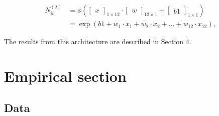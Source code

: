 \begin{align*}
N_{it}^{(\lambda)} &=  
\phi 
(
\begin{bmatrix}
x
\end{bmatrix}_{1 \times 12} \cdot
\begin{bmatrix}
w
\end{bmatrix}_{12 \times 1} +
\begin{bmatrix}
b1
\end{bmatrix}_{1 \times 1}
)\\
&= \exp(b1 + w_1 \cdot x_1 + w_2 \cdot x_2 + ... + w_{12} \cdot x_{12}),
\end{align*}

\noindent The results from this architecture are described in Section 4.


\section{Empirical section}
\label{S:1.3}

\subsection{Data}
\label{sec3-1}


